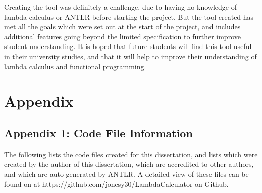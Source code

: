 \documentclass[a4paper,11pt]{report}
\begin{document}
Creating the tool was definitely a challenge, due to having no knowledge of lambda calculus or ANTLR before starting the project. But the tool created has met all the goals which were set out at the start of the project, and includes additional features going beyond the limited specification to further improve student understanding. It is hoped that future students will find this tool useful in their university studies, and that it will help to improve their understanding of lambda calculus and functional programming.

\newpage
\renewcommand*{\bibfont}{\small}
\printbibliography
\newpage

\chapter{Appendix}
\section{Appendix 1: Code File Information}
\setlength{\parindent}{0em}

The following lists the code files created for this dissertation, and lists which were created by the author of this dissertation, which are accredited to other authors, and which are auto-generated by ANTLR. A detailed view of these files can be found on at https://github.com/jonesy30/LambdaCalculator on Github.\\
\end{document}
